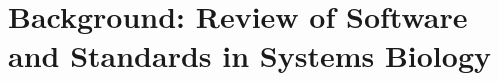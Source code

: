 \newcommand{\bgamma}{\mbox{\boldmath $\Gamma$}}

\newcommand{\bL}{\mbox{\boldmath $L$}}

\newcommand{\bT}{\mbox{\boldmath $T$}}

\newcommand{\bI}{\mbox{\boldmath $I$}}

\newcommand{\bM}{\mbox{\boldmath $M$}}

\newcommand{\bm}{\mbox{\boldmath $m$}}

\newcommand{\bN}{\mbox{\boldmath $N$}}

\newcommand{\bE}{\mbox{\boldmath $E$}}

\newcommand{\bA}{\mbox{\boldmath $A$}}

\newcommand{\bB}{\mbox{\boldmath $B$}}

\newcommand{\bK}{\mbox{\boldmath $K$}}

\newcommand{\bP}{\mbox{\boldmath $P$}}

\newcommand{\bx}{\mbox{\boldmath $x$}}

\newcommand{\bU}{\mbox{\boldmath $U$}}

\newcommand{\bV}{\mbox{\boldmath $V$}}

\newcommand{\bZero}{\mbox{\boldmath $0$}}

\newcommand{\bLo}{\mbox{\boldmath $L_0$}}

\newcommand{\bNo}{\mbox{\boldmath $N_0$}}

\newcommand{\bNr}{\mbox{\boldmath $N_R$}}

\newcommand{\bSi}{\mbox{\boldmath $S_i$}}

\newcommand{\bSd}{\mbox{\boldmath $S_d$}}

\newcommand{\bdSi}{\mbox{\boldmath $dS_i$}}

\newcommand{\bdSd}{\mbox{\boldmath $dS_d$}}

\newcommand{\bS}{\mbox{\boldmath $S$}}

\newcommand{\bdS}{\mbox{\boldmath $dS$}}

\newcommand{\bdt}{\mbox{\boldmath $dt$}}

\newcommand{\bdSdt}{\mbox{$\displaystyle \frac{\bdS}{\bdt}$}}

\newcommand{\bdSddt}{\mbox{$\displaystyle \frac{\bdS_d}{\bdt}$}}

\newcommand{\bdSidt}{\mbox{$\displaystyle \frac{\bdS_i}{\bdt}$}}

\newcommand{\bv}{\mbox{\boldmath $v$}}

\newcommand{\bp}{\mbox{\boldmath $p$}}


\chapter{Background: Review of Software and Standards in Systems Biology}
\label{chap:background}

